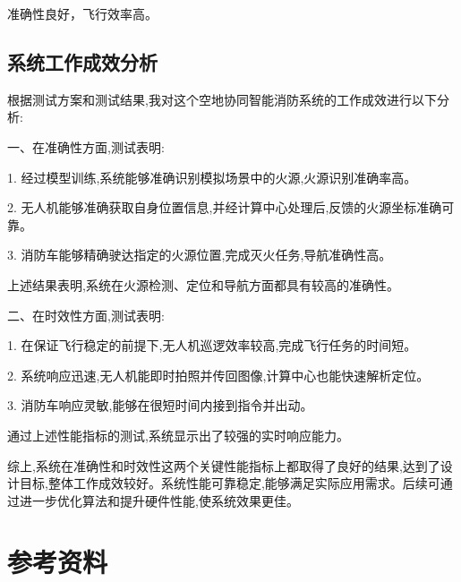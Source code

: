 \documentclass[12pt, a4paper, oneside]{article}
\begin{document}
准确性良好，飞行效率高。

\subsection{系统工作成效分析}

根据测试方案和测试结果,我对这个空地协同智能消防系统的工作成效进行以下分析:

一、在准确性方面,测试表明:

1. 经过模型训练,系统能够准确识别模拟场景中的火源,火源识别准确率高。

2. 无人机能够准确获取自身位置信息,并经计算中心处理后,反馈的火源坐标准确可靠。

3. 消防车能够精确驶达指定的火源位置,完成灭火任务,导航准确性高。

上述结果表明,系统在火源检测、定位和导航方面都具有较高的准确性。

二、在时效性方面,测试表明:

1. 在保证飞行稳定的前提下,无人机巡逻效率较高,完成飞行任务的时间短。

2. 系统响应迅速,无人机能即时拍照并传回图像,计算中心也能快速解析定位。

3. 消防车响应灵敏,能够在很短时间内接到指令并出动。

通过上述性能指标的测试,系统显示出了较强的实时响应能力。

综上,系统在准确性和时效性这两个关键性能指标上都取得了良好的结果,达到了设计目标,整体工作成效较好。系统性能可靠稳定,能够满足实际应用需求。后续可通过进一步优化算法和提升硬件性能,使系统效果更佳。



\pagebreak

\appendix

\section{参考资料}
\end{document}
